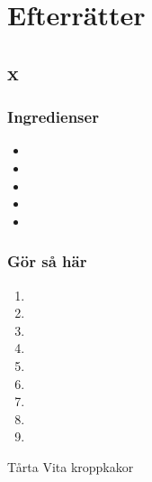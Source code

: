 \documentclass[a4paper,11pt,twocolumn]{article}
\begin{document}
\newpage
\section{Efterrätter}





\subsection{x}
\subsubsection*{Ingredienser}
\begin{itemize}[noitemsep]
    \item
    \item
    \item
    \item
    \item
\end{itemize}
\subsubsection*{Gör så här}
\begin{enumerate}[label=\arabic*.]
    \item
    \item
    \item
    \item
    \item
    \item
    \item
    \item
    \item
\end{enumerate}

Tårta
Vita kroppkakor
\end{document}
